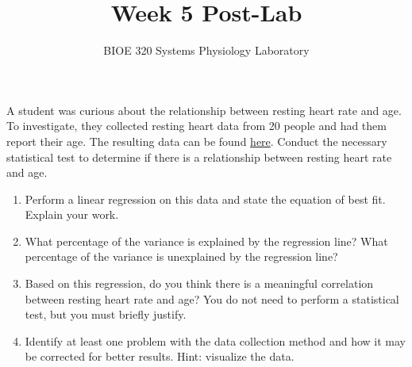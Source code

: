 \documentclass{article}
\title{Week 5 Post-Lab}
\author{BIOE 320 Systems Physiology Laboratory}
\date{}
\begin{document}
\maketitle
\large

A student was curious about the relationship between resting heart rate and age. To investigate, they collected resting heart data from 20 people and had them report their age. The resulting data can be found \href{https://jameslong12.github.io/BIOE320/Assignments.html}{here}. Conduct the necessary statistical test to determine if there is a relationship between resting heart rate and age.

\begin{enumerate}
	\item Perform a linear regression on this data and state the equation of best fit. Explain your work.
	\item What percentage of the variance is explained by the regression line? What percentage of the variance is unexplained by the regression line?
	\item Based on this regression, do you think there is a meaningful correlation between resting heart rate and age? You do not need to perform a statistical test, but you must briefly justify.
	\item Identify at least one problem with the data collection method and how it may be corrected for better results. Hint: visualize the data.
\end{enumerate}
\end{document}
